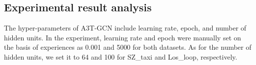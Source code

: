 \documentclass[10pt,journal,compsoc]{IEEEtran}
\begin{document}

\subsection{ Experimental result analysis}

\par The hyper-parameters of A3T-GCN include learning rate, epoch, and number of hidden units. In the experiment, learning rate and epoch were manually set on the basis of experiences as 0.001 and 5000 for both datasets. As for the number of hidden units, we set it to 64 and 100 for SZ\_taxi and Los\_loop, respectively.
\end{document}
